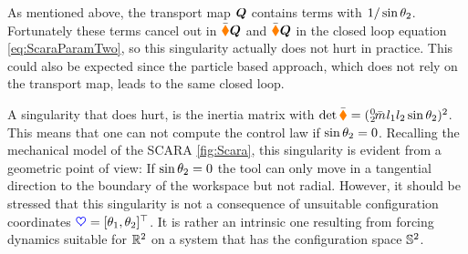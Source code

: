 As mentioned above, the transport map $\sysTransportMap$ contains terms with $\sfrac{1}{\sin\jointAngle[2]}$. 
Fortunately these terms cancel out in $\sysInertiaMatC\sysTransportMap$ and $\sysDissMatC\sysTransportMap$ in the closed loop equation \eqref{eq:ScaraParamTwo}, so this singularity actually does not hurt in practice.
This could also be expected since the particle based approach, which does not rely on the transport map, leads to the same closed loop.

A singularity that does hurt, is the inertia matrix with $\det\sysInertiaMatC = (\bodyMassC{0}{2} l_1 l_2 \sin\jointAngle[2])^2$.
This means that one can not compute the control law if $\sin\jointAngle[2] = 0$.
Recalling the mechanical model of the SCARA \autoref{fig:Scara}, this singularity is evident from a geometric point of view: 
If $\sin\jointAngle[2] = 0$ the tool can only move in a tangential direction to the boundary of the workspace but not radial.
However, it should be stressed that this singularity is not a consequence of unsuitable configuration coordinates $\sysCoord = [\jointAngle[1], \jointAngle[2]]^\top$.
It is rather an intrinsic one resulting from forcing dynamics suitable for $\RealNum^2$ on a system that has the configuration space $\Sphere^2$. 
 


